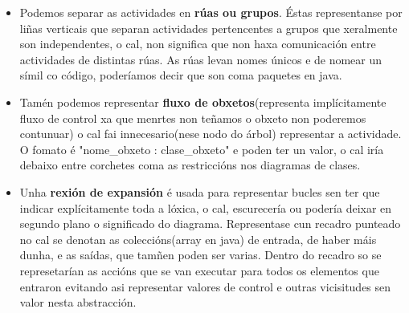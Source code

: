\begin{itemize}
		\item Podemos separar as actividades en \textbf{rúas ou grupos}. Éstas representanse por liñas verticais que separan actividades pertencentes a grupos que xeralmente son independentes, o cal, non significa que non haxa comunicación entre actividades de distintas rúas. As rúas levan nomes únicos e de nomear un símil co código, poderíamos decir que son coma paquetes en java.
		\item Tamén podemos representar \textbf{fluxo de obxetos}(representa implícitamente fluxo de control xa que menrtes non teñamos o obxeto non poderemos contunuar) o cal fai innecesario(nese nodo do árbol) representar a actividade. O fomato é "nome\_obxeto : clase\_obxeto" e poden ter un valor, o cal iría debaixo entre corchetes coma as restriccións nos diagramas de clases.
		\item Unha \textbf{rexión de expansión} é usada para representar bucles sen ter que indicar explícitamente toda a lóxica, o cal, escurecería ou podería deixar en segundo plano o significado do diagrama. Representase cun recadro punteado no cal se denotan as coleccións(array en java) de entrada, de haber máis dunha, e as saídas, que tamñen poden ser varias. Dentro do recadro so se represetarían as accións que se van executar para todos os elementos que entraron evitando asi representar valores de control e outras vicisitudes sen valor nesta abstracción.
	\end{itemize}